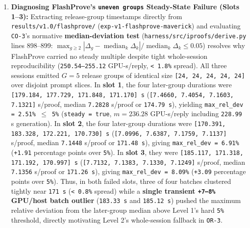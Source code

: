 \documentclass[11pt,letterpaper]{article}
\begin{document}
\begin{enumerate}
\item \textbf{Diagnosing FlashProve's \texttt{uneven groups} Steady-State Failure (Slots 1--3):} Extracting release-group timestamps directly from \texttt{results/\allowbreak{}v1.0/\allowbreak{}flashprove/} (\texttt{exp-\allowbreak{}v1-\allowbreak{}flashprove-\allowbreak{}maverick}) and evaluating \texttt{CO-3}'s normative \textbf{median-deviation test} (\texttt{harness/\allowbreak{}src/\allowbreak{}iproofs/\allowbreak{}derive.\allowbreak{}py} lines 898--899: $\max_{g \ge 2} |\Delta_g - \operatorname{median}_k \Delta_k| / \operatorname{median}_k \Delta_k \le 0.05$) resolves why FlashProve carried no steady multiple despite tight whole-session reproducibility (\texttt{250.54--255.12} GPU-s/reply, \texttt{< 1.8\%} spread). All three sessions emitted $G = 5$ release groups of identical size \texttt{[24, 24, 24, 24, 24]} over disjoint prompt slices. In \textbf{slot 1}, the four later-group durations were \texttt{[179.184, 177.729, 171.848, 171.170] s} (\texttt{[7.4660, 7.4054, 7.1603, 7.1321]} s/proof, median \texttt{7.2828} s/proof or \texttt{174.79 s}), yielding \texttt{max\_\allowbreak{}rel\_\allowbreak{}dev = 2.51\% $\le$ 5\%} (\texttt{steady = true}, $m = 236.28$ GPU-s/reply including \texttt{228.99} s generation). In \textbf{slot 2}, the four later-group durations were \texttt{[170.391, 183.328, 172.221, 170.730] s} (\texttt{[7.0996, 7.6387, 7.1759, 7.1137]} s/proof, median \texttt{7.1448} s/proof or \texttt{171.48 s}), giving \texttt{max\_\allowbreak{}rel\_\allowbreak{}dev = 6.91\%} (\texttt{+1.91} percentage points over \texttt{5\%}). In \textbf{slot 3}, they were \texttt{[185.117, 171.318, 171.192, 170.997] s} (\texttt{[7.7132, 7.1383, 7.1330, 7.1249]} s/proof, median \texttt{7.1356} s/proof or \texttt{171.26 s}), giving \texttt{max\_\allowbreak{}rel\_\allowbreak{}dev = 8.09\%} (\texttt{+3.09} percentage points over \texttt{5\%}). Thus, in both failed slots, three of four batches clustered tightly near \texttt{171 s} (\texttt{< 0.8\%} spread) while a \textbf{single transient \texttt{+7--8\%} GPU/host batch outlier} (\texttt{183.33 s} and \texttt{185.12 s}) pushed the maximum relative deviation from the later-group median above Level 1's hard \texttt{5\%} threshold, directly motivating Level 2's whole-session fallback in \texttt{OR-3}.

\end{enumerate}
\end{document}
